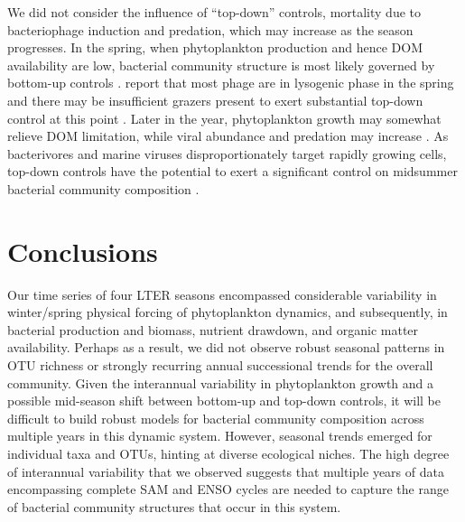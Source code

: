 We did not consider the influence of ``top-down'' controls, mortality due to bacteriophage induction and predation, which may increase as the season progresses. In the spring, when phytoplankton production and hence DOM availability are low, bacterial community structure is most likely governed by bottom-up controls \citep{bowman2016segmentation}. \citet{Brum2016-ig} report that most phage are in lysogenic phase in the spring and there may be insufficient grazers present to exert substantial top-down control at this point \citep{bowman2016segmentation}. Later in the year, phytoplankton growth may somewhat relieve DOM limitation, while viral abundance and predation may increase \citep{garzio2013microzooplankton,bird1999uncoupling}. As bacterivores and marine viruses disproportionately target rapidly growing cells, top-down controls have the potential to exert a significant control on midsummer bacterial community composition \citep{Fuhrman1993-zk,garzio2013microzooplankton}. 

\section{Conclusions}

Our time series of four LTER seasons encompassed considerable variability in winter/spring physical forcing of phytoplankton dynamics, and subsequently, in bacterial production and biomass, nutrient drawdown, and organic matter availability. Perhaps as a result, we did not observe robust seasonal patterns in OTU richness or strongly recurring annual successional trends for the overall community. Given the interannual variability in phytoplankton growth and a possible mid-season shift between bottom-up and top-down controls, it will be difficult to build robust models for bacterial community composition across multiple years in this dynamic system. However, seasonal trends emerged for individual taxa and OTUs, hinting at diverse ecological niches. The high degree of interannual variability that we observed suggests that multiple years of data encompassing complete SAM and ENSO cycles are needed to capture the range of bacterial community structures that occur in this system.
